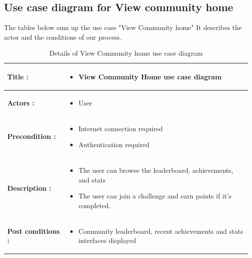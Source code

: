 \documentclass[12pt,a4paper]{report}
\begin{document}
\subsection{Use case diagram for View community home}
The tables below sum up the use case "View Community home" It describes the actor and the conditions of our process.
\begin{table}[H]
    \centering
    \renewcommand{\arraystretch}{1} 
        \caption{Details of View Community home use case diagram}
    \vspace{0.4em}
        \begin{tabular}{|p{3.5cm}|p{8.5cm}|}
        \hline
        \textbf{Title :} & 
        \begin{itemize}[label=$\bullet$, leftmargin=*, nosep, before=\vspace{-0.6\baselineskip}]
            \item View Community Home use case diagram
        \end{itemize} \\ \hline
        
        \textbf{Actors :} & 
        \begin{itemize}[label=$\bullet$, leftmargin=*, nosep, before=\vspace{-0.6\baselineskip}]
            \item User
        \end{itemize} \\ \hline
        
        \textbf{Precondition :} & 
        \begin{itemize}[label=$\bullet$, leftmargin=*, nosep, before=\vspace{-0.6\baselineskip}]
            \item Internet connection required
            \item Authentication required
        \end{itemize} \\ \hline
        
        \textbf{Description :} & 
        \begin{itemize}[label=$\bullet$, leftmargin=*, nosep, before=\vspace{-0.6\baselineskip}]
            \item The user can browse the leaderboard, achievements, and stats
            \item The user can join a challenge and earn points if it's completed. 
        \end{itemize} \\ \hline
        
        \textbf{Post conditions :} & 
        \begin{itemize}[label=$\bullet$, leftmargin=*, nosep, before=\vspace{-0.6\baselineskip}]
            \item Community leaderboard, recent achievements and stats interfaces displayed
        \end{itemize} \\ \hline
    \end{tabular}
\end{table}
\end{document}
